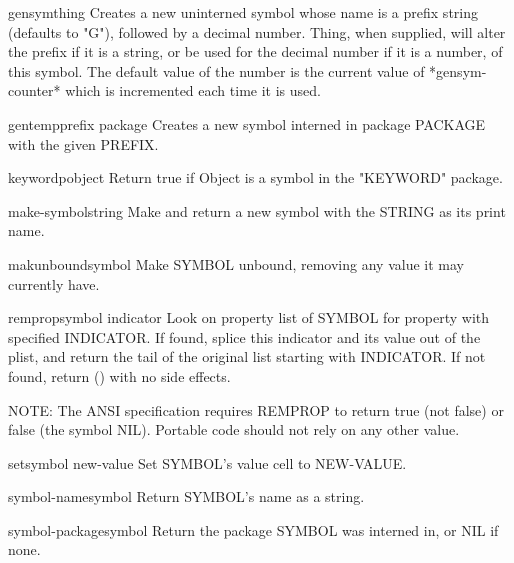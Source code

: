 \documentclass[10pt,english]{book}
\begin{document}
\begin{function}{gensym}{\op thing}
  Creates a new uninterned symbol whose name is a prefix string (defaults
   to "G"), followed by a decimal number. Thing, when supplied, will
   alter the prefix if it is a string, or be used for the decimal number
   if it is a number, of this symbol. The default value of the number is
   the current value of *gensym-counter* which is incremented each time
   it is used.
\end{function}

\begin{function}{gentemp}{\op prefix package}
  Creates a new symbol interned in package PACKAGE with the given PREFIX.
\end{function}

\begin{function}{keywordp}{object}
  Return true if Object is a symbol in the "KEYWORD" package.
\end{function}

\begin{function}{make-symbol}{string}
  Make and return a new symbol with the STRING as its print name.
\end{function}

\begin{function}{makunbound}{symbol}
  Make SYMBOL unbound, removing any value it may currently have.
\end{function}

\begin{function}{remprop}{symbol indicator}
  Look on property list of SYMBOL for property with specified
  INDICATOR. If found, splice this indicator and its value out of
  the plist, and return the tail of the original list starting with
  INDICATOR. If not found, return () with no side effects.

  NOTE: The ANSI specification requires REMPROP to return true (not false)
  or false (the symbol NIL). Portable code should not rely on any other value.
\end{function}

\begin{function}{set}{symbol new-value}
  Set SYMBOL's value cell to NEW-VALUE.
\end{function}

\begin{function}{symbol-name}{symbol}
  Return SYMBOL's name as a string.
\end{function}

\begin{function}{symbol-package}{symbol}
  Return the package SYMBOL was interned in, or NIL if none.
\end{function}
\end{document}
